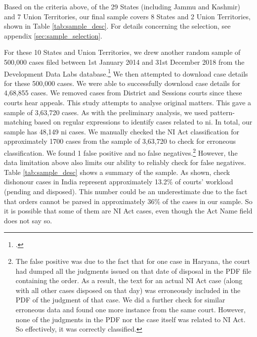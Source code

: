 Based on the criteria above, of the 29 States (including Jammu and Kashmir) and 7 Union Territories, our final sample covers 8 States and 2 Union Territories, shown in Table \ref{tab:sample_desc}. For details concerning the selection, see appendix \ref{sec:sample_selection}.

For these 10 States and Union Territories, we drew another random sample of 500,000 cases filed between 1st January 2014 and 31st December 2018 from the Development Data Labs database.\footcite{devdatalabs2021_eCourtsData} We then attempted to download case details for these 500,000 cases. We were able to successfully download case details for 4,68,855 cases. We removed cases from District and Sessions courts since these courts hear appeals. This study attempts to analyse original matters. This gave a sample of 3,63,720 cases. As with the preliminary analysis, we used pattern-matching based on regular expressions to identify cases related to \gls{ni}. In total, our sample has 48,149 \gls{ni} cases. We manually checked the NI Act classification for approximately 1700 cases from the sample of 3,63,720 to check for erroneous classification. We found 1 false positive and no false negatives.\footnote{The false positive was due to the fact that for one case in Haryana, the court had dumped all the judgments issued on that date of disposal in the PDF file containing the order. As a result, the text for an actual NI Act case (along with all other cases disposed on that day) was erroneously included in the PDF of the judgment of that case. We did a further check for similar erroneous data and found one more instance from the same court. However, none of the judgments in the PDF nor the case itself was related to NI Act. So effectively, it was correctly classified.} However, the data limitation above also limits our ability to reliably check for false negatives. Table \ref{tab:sample_desc} shows a summary of the sample. As shown, check dishonour cases in India represent approximately 13.2\% of courts' workload (pending and disposed). This number could be an underestimate due to the fact that orders cannot be parsed in approximately 36\% of the cases in our sample. So it is possible that some of them are NI Act cases, even though the Act Name field does not say so.

